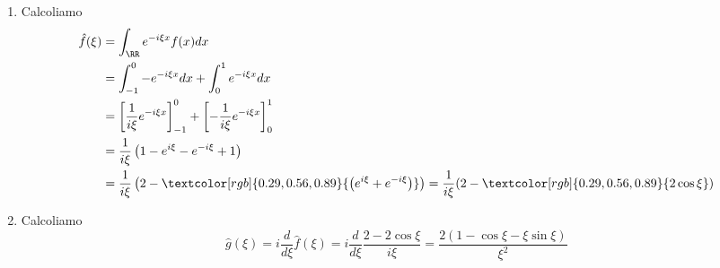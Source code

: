 \Soluzione

\begin{enumerate}
\item Calcoliamo
\begin{equation*}
\begin{aligned}
\hat{f}(\xi) & = \int_{\RR} e^{- i\xi x} f(x) dx\\
 & = \int^{0}_{- 1} - e^{- i\xi x} dx + \int^{1}_{0} e^{- i\xi x} dx\\
 & = \left[\frac{1}{i\xi} e^{- i\xi x}\right]^{0}_{- 1} + \left[ - \frac{1}{i\xi} e^{- i\xi x}\right]^{1}_{0}\\
 & = \frac{1}{i\xi}\left(1 - e^{i\xi} - e^{- i\xi} + 1\right)\\
 & = \frac{1}{i\xi}\left(2 - \textcolor[rgb]{0.29, 0.56, 0.89}{\left(e^{i\xi} + e^{- i\xi}\right)}\right) = \frac{1}{i\xi}(2 - \textcolor[rgb]{0.29, 0.56, 0.89}{2\cos\xi})
\end{aligned}
\end{equation*}
\item Calcoliamo
\begin{equation*}
\hat{g}(\xi) = i\frac{d}{d\xi}\hat{f}(\xi) = i\frac{d}{d\xi}\frac{2 - 2\cos \xi}{i\xi} = \frac{2(1 - \cos \xi - \xi \sin \xi)}{\xi^{2}}
\end{equation*}
\end{enumerate}

\Soluzione

